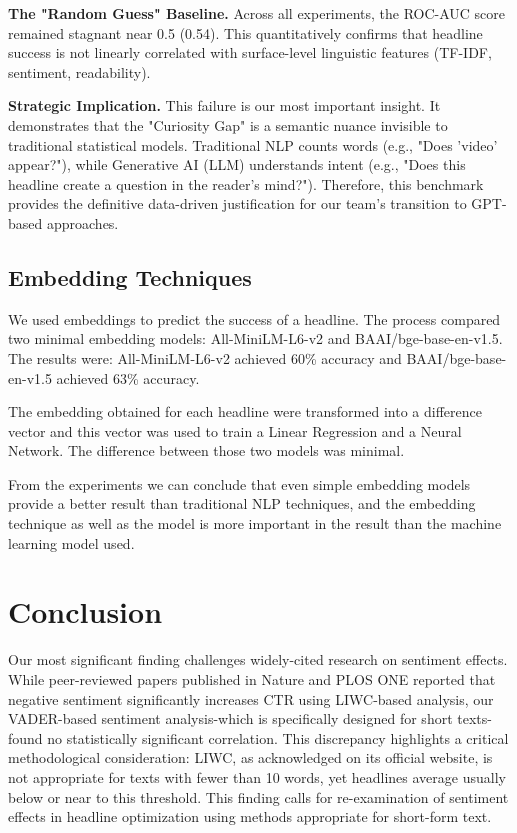 \documentclass[11pt]{article}
\begin{document}
\textbf{The "Random Guess" Baseline.} Across all experiments, the ROC-AUC score remained stagnant near 0.5 (0.54). This quantitatively confirms that headline success is not linearly correlated with surface-level linguistic features (TF-IDF, sentiment, readability).

\textbf{Strategic Implication.} This failure is our most important insight. It demonstrates that the "Curiosity Gap" is a semantic nuance invisible to traditional statistical models. Traditional NLP counts words (e.g., "Does 'video' appear?"), while Generative AI (LLM) understands intent (e.g., "Does this headline create a question in the reader's mind?"). Therefore, this benchmark provides the definitive data-driven justification for our team's transition to GPT-based approaches.

\subsection{Embedding Techniques}

We used embeddings to predict the success of a headline. The process compared two minimal embedding models: All-MiniLM-L6-v2 and BAAI/bge-base-en-v1.5. The results were: All-MiniLM-L6-v2 achieved 60\% accuracy and BAAI/bge-base-en-v1.5 achieved 63\% accuracy.

The embedding obtained for each headline were transformed into a difference vector and this vector was used to train a Linear Regression and a Neural Network. The difference between those two models was minimal.

From the experiments we can conclude that even simple embedding models provide a better result than traditional NLP techniques, and the embedding technique as well as the model is more important in the result than the machine learning model used.

\section{Conclusion}

Our most significant finding challenges widely-cited research on sentiment effects. While peer-reviewed papers published in Nature and PLOS ONE reported that negative sentiment significantly increases CTR using LIWC-based analysis, our VADER-based sentiment analysis-which is specifically designed for short texts-found no statistically significant correlation. This discrepancy highlights a critical methodological consideration: LIWC, as acknowledged on its official website, is not appropriate for texts with fewer than 10 words, yet headlines average usually below or near to this threshold. This finding calls for re-examination of sentiment effects in headline optimization using methods appropriate for short-form text.
\end{document}
